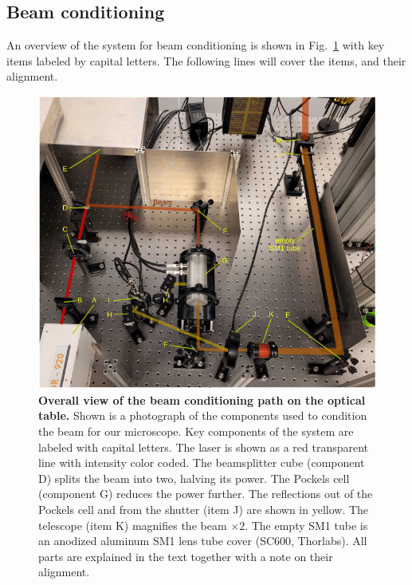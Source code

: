 \documentclass[10pt,letterpaper]{article}
\begin{document}
\subsection{Beam conditioning}
An overview of the system for beam conditioning is shown in Fig.~\ref{sfig1} with key items labeled by capital letters. The following lines will cover the items, and their alignment.
%
\begin{figure}[!t]
    \includegraphics[width=\textwidth]{sfig1.jpg}
    \caption{{\bf Overall view of the beam conditioning path on the optical table.} Shown is a photograph of the components used to condition the beam for our microscope. Key components of the system are labeled with capital letters. The laser is shown as a red transparent line with intensity color coded. The beamsplitter cube (component D) splits the beam into two, halving its power. The Pockels cell (component G) reduces the power further. The reflections out of the Pockels cell and from the shutter (item J) are shown in yellow. The telescope (item K) magnifies the beam $\times 2$. The empty SM1 tube is an anodized aluminum SM1 lens tube cover (SC600, Thorlabs). All parts are explained in the text together with a note on their alignment.}
    \label{sfig1}
\end{figure}
%
\end{document}
